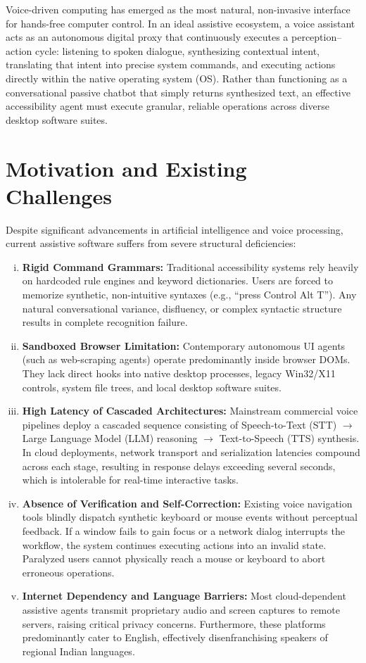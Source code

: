 \documentclass[12pt,a4paper]{report}
\begin{document}
Voice-driven computing has emerged as the most natural, non-invasive interface for hands-free computer control. In an ideal assistive ecosystem, a voice assistant acts as an autonomous digital proxy that continuously executes a perception--action cycle: listening to spoken dialogue, synthesizing contextual intent, translating that intent into precise system commands, and executing actions directly within the native operating system (OS). Rather than functioning as a conversational passive chatbot that simply returns synthesized text, an effective accessibility agent must execute granular, reliable operations across diverse desktop software suites.

\section{Motivation and Existing Challenges}
Despite significant advancements in artificial intelligence and voice processing, current assistive software suffers from severe structural deficiencies:
\begin{enumerate}[(i)]
    \item \textbf{Rigid Command Grammars:} Traditional accessibility systems rely heavily on hardcoded rule engines and keyword dictionaries. Users are forced to memorize synthetic, non-intuitive syntaxes (e.g., ``press Control Alt T''). Any natural conversational variance, disfluency, or complex syntactic structure results in complete recognition failure.
    \item \textbf{Sandboxed Browser Limitation:} Contemporary autonomous UI agents (such as web-scraping agents) operate predominantly inside browser DOMs. They lack direct hooks into native desktop processes, legacy Win32/X11 controls, system file trees, and local desktop software suites.
    \item \textbf{High Latency of Cascaded Architectures:} Mainstream commercial voice pipelines deploy a cascaded sequence consisting of Speech-to-Text (STT) $\rightarrow$ Large Language Model (LLM) reasoning $\rightarrow$ Text-to-Speech (TTS) synthesis. In cloud deployments, network transport and serialization latencies compound across each stage, resulting in response delays exceeding several seconds, which is intolerable for real-time interactive tasks.
    \item \textbf{Absence of Verification and Self-Correction:} Existing voice navigation tools blindly dispatch synthetic keyboard or mouse events without perceptual feedback. If a window fails to gain focus or a network dialog interrupts the workflow, the system continues executing actions into an invalid state. Paralyzed users cannot physically reach a mouse or keyboard to abort erroneous operations.
    \item \textbf{Internet Dependency and Language Barriers:} Most cloud-dependent assistive agents transmit proprietary audio and screen captures to remote servers, raising critical privacy concerns. Furthermore, these platforms predominantly cater to English, effectively disenfranchising speakers of regional Indian languages.
\end{enumerate}
\end{document}
